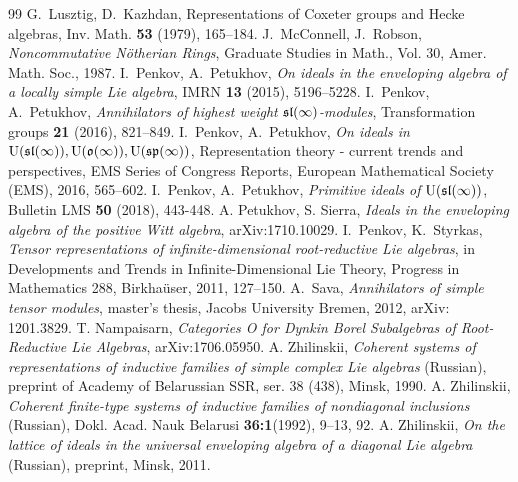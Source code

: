 \documentclass[10pt]{amsart}\oddsidemargin -1mm \evensidemargin -1mm \topmargin -15mm\headheight5mm \headsep 3.5mm \textheight 245mm\textwidth 170mm
\theoremstyle{definition}\newtheorem{theorem}{Theorem}[section]\newtheorem{lemma}[theorem]{Lemma}\newtheorem{remark}[theorem]{Remark}\newtheorem{proposition}[theorem]{Proposition}\newtheorem{corollary}[theorem]{Corollary}\newtheorem{definition}[theorem]{Definition}\newtheorem{Ex}[theorem]{Example}\newtheorem{obs}[theorem]{Observation}\newtheorem{nota}[theorem]{Notation}
\begin{document}
\begin{thebibliography}{99}
 G.~Lusztig, D.~Kazhdan, Representations of Coxeter groups and Hecke algebras, Inv. Math. {\bf 53} (1979), 165--184.
 J.~McConnell, J.~Robson, {\it Noncommutative N\"otherian Rings}, Graduate Studies in Math., Vol. 30, Amer. Math. Soc., 1987.
 I.~Penkov, A.~Petukhov, {\it On ideals in the enveloping algebra of a locally simple Lie algebra},  IMRN {\bf 13} (2015), 5196--5228.
 I.~Penkov, A.~Petukhov, {\it Annihilators of highest weight $\frak{sl}(\infty)$-modules}, Transformation groups {\bf 21} (2016), 821--849.
 I.~Penkov, A.~Petukhov, {\it On ideals  in ${\rm U}(\frak{sl}(\infty)), {\rm U}(\frak{o}(\infty)), {\rm U}(\frak{sp}(\infty))$}, Representation theory - current trends and perspectives, EMS Series of Congress Reports, European Mathematical Society (EMS), 2016, 565--602.
 I.~Penkov, A.~Petukhov, {\it Primitive ideals  of ${\rm U}(\frak{sl}(\infty))$}, Bulletin LMS {\bf 50} (2018), 443-448.
 A. Petukhov, S. Sierra, {\it Ideals in the enveloping algebra of the positive Witt algebra}, arXiv:1710.10029.
 I.~Penkov, K.~Styrkas, {\it Tensor representations of infinite-dimensional root-reductive Lie algebras}, in Developments and Trends in Infinite-Dimensional Lie Theory, Progress in Mathematics 288, Birkha\"user, 2011, 127--150.
 A.~Sava, {\it Annihilators of simple tensor modules}, master’s thesis, Jacobs University Bremen, 2012, arXiv: 1201.3829.
 T. Nampaisarn, {\it Categories O for Dynkin Borel Subalgebras of Root-Reductive Lie Algebras}, arXiv:1706.05950.
 A. Zhilinskii, {\it Coherent systems of representations of inductive families of simple complex Lie algebras} (Russian), preprint of Academy of Belarussian SSR, ser. 38 (438), Minsk, 1990.
 A. Zhilinskii, {\it Coherent finite-type systems of inductive families of nondiagonal inclusions} (Russian),  Dokl. Acad. Nauk Belarusi {\bf 36:1}(1992), 9--13, 92.
 A. Zhilinskii, {\it On the lattice of ideals in the universal enveloping algebra of a diagonal Lie algebra} (Russian), preprint, Minsk, 2011.
\end{thebibliography}
\end{document}
